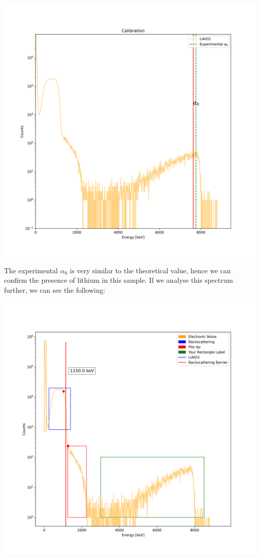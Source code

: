 \documentclass{article}
\begin{document}
\begin{multicols}{2}
\begin{center}
    \label{TT_21}
    \centering
    \includegraphics[scale = 0.35]{../../images/OverlapLiAlO2.png}
\end{center}

The experimental $\alpha_0$ is very similar to the theoretical value, hence we can confirm the presence of lithium in this sample. 
If we analyse this spectrum further, we can see the following:

\begin{center}
    \label{TT_21}
    \centering
    \includegraphics[scale = 0.4]{../../images/FullAnalysisLiAlO2.png}
\end{center}


\end{multicols}
\end{document}
